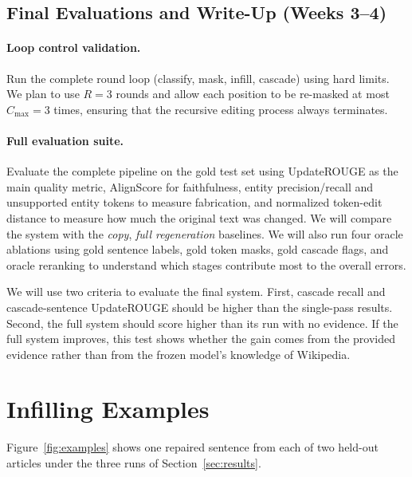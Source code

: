 \documentclass[11pt]{article}
\begin{document}
    \subsection{Final Evaluations and Write-Up (Weeks 3--4)}
        \paragraph{Loop control validation.} Run the complete round loop (classify, mask, infill, cascade) using hard limits. We plan to use $R=3$ rounds and allow each position to be re-masked at most $C_{\max}=3$ times, ensuring that the recursive editing process always terminates.
    
        \paragraph{Full evaluation suite.} Evaluate the complete pipeline on the gold test set using UpdateROUGE as the main quality metric, AlignScore for faithfulness, entity precision/recall and unsupported entity tokens to measure fabrication, and normalized token-edit distance to measure how much the original text was changed. We will compare the system with the \emph{copy}, \emph{full regeneration} baselines. We will also run four oracle ablations using gold sentence labels, gold token masks, gold cascade flags, and oracle reranking to understand which stages contribute most to the overall errors.
    
        We will use two criteria to evaluate the final system. First, cascade recall and cascade-sentence UpdateROUGE should be higher than the single-pass results. Second, the full system should score higher than its run with no evidence. If the full system improves, this test shows whether the gain comes from the provided evidence rather than from the frozen model's knowledge of Wikipedia.

\clearpage


\clearpage
\appendix
\raggedbottom
\setlength{\intextsep}{6pt plus 2pt minus 2pt}

\section{Infilling Examples}
\label{app:examples}

Figure~\ref{fig:examples} shows one repaired sentence from each of two held-out articles under the three runs of Section~\ref{sec:results}.
\end{document}
